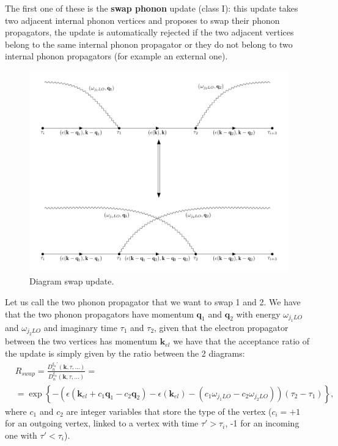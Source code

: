 The first one of these is the \textbf{swap phonon} update (class I): this update takes two adjacent internal phonon vertices and proposes to swap their 
phonon propagators, the update is automatically rejected if the two adjacent vertices belong to the same internal phonon propagator or they do not 
belong to two internal phonon propagators (for example an external one).
\begin{figure}[H]
    \centering
    \includegraphics[scale=0.6]{swap_update.pdf}
    \caption{Diagram swap update.}
    \label{fig:swap_diagram}
\end{figure}
Let us call the two phonon propagator that we want to swap 1 and 2. We have that the two phonon propagators have momentum $\mathbf{q}_1$ and $\mathbf{q}_2$ with 
energy $\omega_{j_1LO}$ and $\omega_{j_2LO}$ and imaginary time $\tau_1$ and $\tau_2$, given that the electron propagator between the two vertices has momentum $\mathbf{k}_{el}$ we have that 
the acceptance ratio of the update is simply given by the ratio between the 2 diagrams:
\begin{equation}
\begin{split}
    &R_{swap}=\frac{D_n^{\xi_n'}(\mathbf{k},\tau,...)}{D_n^{\xi_n}(\mathbf{k},\tau,...)}=\\
    &=\exp\left\{-\left(\epsilon(\mathbf{k}_{el}+c_1\mathbf{q}_1-c_2\mathbf{q}_2)-\epsilon(\mathbf{k}_{el})-(c_1\omega_{j_1LO}-c_2\omega_{j_2LO})\right)(\tau_2-\tau_1)\right\},
\end{split}
\end{equation}
where $c_1$ and $c_2$ are integer variables that store the type of the vertex ($c_i=+1$ for an outgoing vertex, linked to a vertex with time $\tau'>\tau_i$, -1 for an incoming one with $\tau'<\tau_i$).\\
